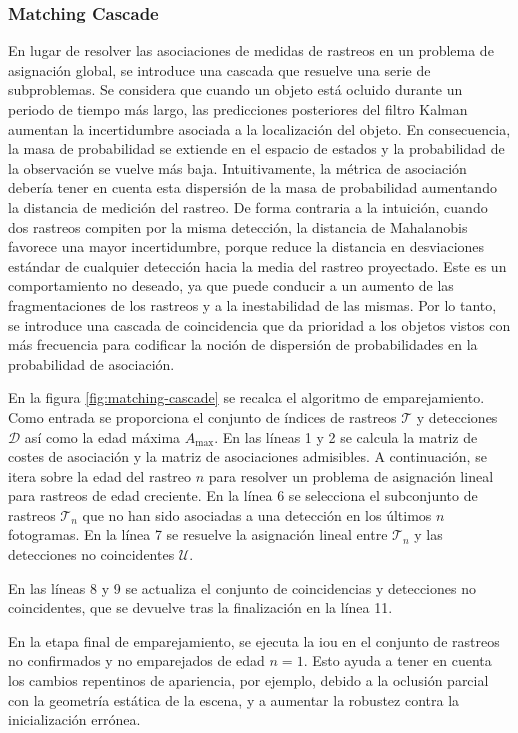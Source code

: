 \subsubsection*{Matching Cascade}
\label{subsubsec:matching-cascade}

En lugar de resolver las asociaciones de medidas de rastreos en un problema de asignación global, se introduce una cascada que resuelve una serie de subproblemas. Se considera que cuando un objeto está ocluido durante un periodo de tiempo más largo, las predicciones posteriores del filtro Kalman aumentan la incertidumbre asociada a la localización del objeto. En consecuencia, la masa de probabilidad se extiende en el espacio de estados y la probabilidad de la observación se vuelve más baja. Intuitivamente, la métrica de asociación debería tener en cuenta esta dispersión de la masa de probabilidad aumentando la distancia de medición del rastreo. De forma contraria a la intuición, cuando dos rastreos compiten por la misma detección, la distancia de Mahalanobis favorece una mayor incertidumbre, porque reduce la distancia en desviaciones estándar de cualquier detección hacia la media del rastreo proyectado. Este es un comportamiento no deseado, ya que puede conducir a un aumento de las fragmentaciones de los rastreos y a la inestabilidad de las mismas. Por lo tanto, se introduce una cascada de coincidencia que da prioridad a los objetos vistos con más frecuencia para codificar la noción de dispersión de probabilidades en la probabilidad de asociación.

En la figura \ref{fig:matching-cascade} se recalca el algoritmo de emparejamiento. Como entrada se proporciona el conjunto de índices de rastreos $\mathcal{T}$ y detecciones $\mathcal{D}$ así como la edad máxima $A_{\text{max}}$. En las líneas 1 y 2 se calcula la matriz de costes de asociación y la matriz de asociaciones admisibles. A continuación, se itera sobre la edad del rastreo $n$ para resolver un problema de asignación lineal para rastreos de edad creciente. En la línea 6 se selecciona el subconjunto de rastreos $\mathcal{T}_{n}$ que no han sido asociadas a una detección en los últimos $n$ fotogramas. En la línea 7 se resuelve la asignación lineal entre $\mathcal{T}_{n}$ y las detecciones no coincidentes $\mathcal{U}$.

En las líneas 8 y 9 se actualiza el conjunto de coincidencias y detecciones no coincidentes, que se devuelve tras la finalización en la línea 11.

En la etapa final de emparejamiento, se ejecuta la \gls{iou} en el conjunto de rastreos no confirmados y no emparejados de edad $n = 1$. Esto ayuda a tener en cuenta los cambios repentinos de apariencia, por ejemplo, debido a la oclusión parcial con la geometría estática de la escena, y a aumentar la robustez contra la inicialización errónea.

